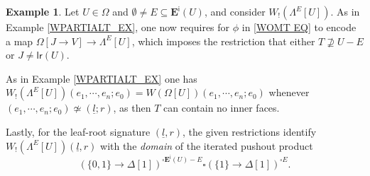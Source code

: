 \documentclass[a4paper,10pt
,draft
]{article}%
\numberwithin{equation}{section}
\numberwithin{figure}{section}
\theoremstyle{definition} %
\newtheorem{example}[equation]{Example}%
\newcommand{\1}{\ensuremath{\mathbbm 1}}%
\begin{document}
\begin{example}\label{WPARTIALT2_EX}
	Let $U\in \Omega$ and 
	$\emptyset \neq E \subseteq \boldsymbol{E}^{\mathsf{i}}(U)$,
	and consider $W_!(\Lambda^E[U])$.
	As in Example \ref{WPARTIALT_EX},
	one now requires for $\phi$ in \eqref{WOMT EQ}
	to encode a map
	$\Omega[J \to V] \to \Lambda^E[U]$,
	which imposes the restriction that
	either $T \not \supseteq U-E$ or
	$J \neq \mathsf{lr}(U)$. 
		
	As in Example \ref{WPARTIALT_EX}
	one has 
	$W_!(\Lambda^E[U])(e_1,\cdots,e_n;e_0) = W(\Omega[U])(e_1,\cdots,e_n;e_0)$
	whenever $(e_1,\cdots,e_n;e_0) \not \simeq (\underline{l};r)$,
	as then $T$ can contain no inner faces.

	Lastly, for the leaf-root signature $(\underline{l},r)$,
	the given restrictions identify
	$W_!(\Lambda^E[U])(\underline{l},r)$ 
	with the \emph{domain} of the iterated pushout product
\[
	\left(
	\{0,1\} \to \Delta[1]
	\right)^{\square \boldsymbol{E}^{\mathsf{i}}(U)-E}
	\square
	\left(
	\{1\} \to \Delta[1]
	\right)^{\square E}.
\]
\end{example}








{}

\end{document}
